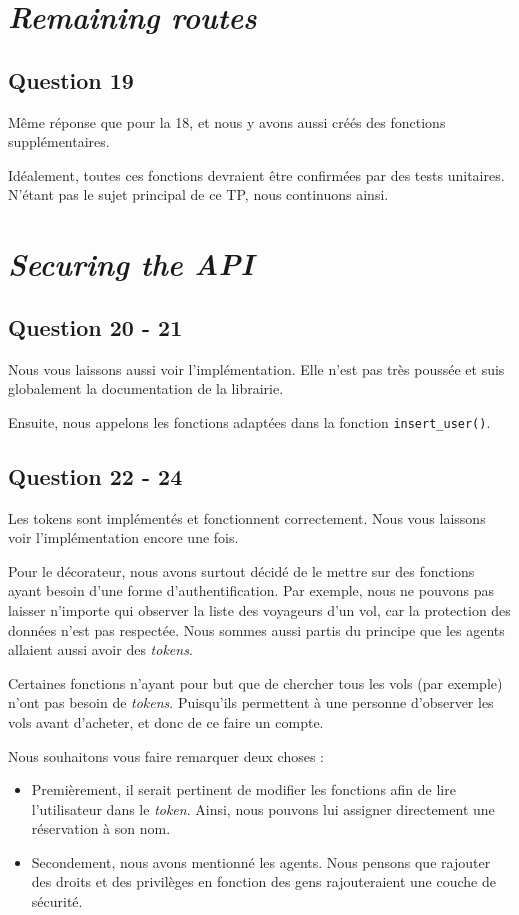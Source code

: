 \documentclass{ceri/sty/rapport}
\begin{document}
\section{\textit{Remaining routes}}
\subsection{Question 19}
Même réponse que pour la 18, et nous y avons aussi créés des fonctions supplémentaires.

Idéalement, toutes ces fonctions devraient être confirmées par des tests unitaires.
N'étant pas le sujet principal de ce TP, nous continuons ainsi.

\section{\textit{Securing the API}}
\subsection{Question 20 - 21}
Nous vous laissons aussi voir l'implémentation. 
Elle n'est pas très poussée et suis globalement la documentation de la librairie.

Ensuite, nous appelons les fonctions adaptées dans la fonction \texttt{insert\_user()}.

\subsection{Question 22 - 24}
Les tokens sont implémentés et fonctionnent correctement.
Nous vous laissons voir l'implémentation encore une fois.

Pour le décorateur, nous avons surtout décidé de le mettre sur des fonctions ayant besoin d'une forme d'authentification.
Par exemple, nous ne pouvons pas laisser n'importe qui observer la liste des voyageurs d'un vol, car la protection des données n'est pas respectée.
Nous sommes aussi partis du principe que les agents allaient aussi avoir des \textit{tokens}.

Certaines fonctions n'ayant pour but que de chercher tous les vols (par exemple) n'ont pas besoin de \textit{tokens}.
Puisqu'ils permettent à une personne d'observer les vols avant d'acheter, et donc de ce faire un compte.

Nous souhaitons vous faire remarquer deux choses :

\begin{itemize}
    \item Premièrement, il serait pertinent de modifier les fonctions afin de lire l'utilisateur dans le \textit{token}. 
    Ainsi, nous pouvons lui assigner directement une réservation à son nom.
    \item Secondement, nous avons mentionné les agents.
    Nous pensons que rajouter des droits et des privilèges en fonction des gens rajouteraient une couche de sécurité. 
\end{itemize}
\end{document}
